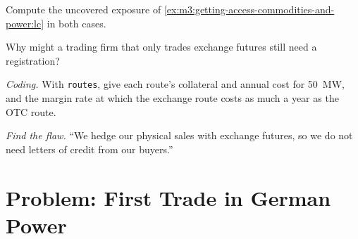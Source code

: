 \begin{exercise}[$\star\star$]\label{exo:m3:getting-access-commodities-and-power:5}
Compute the uncovered exposure of \cref{ex:m3:getting-access-commodities-and-power:lc} in both cases.
\end{exercise}

\begin{exercise}[$\star\star$]\label{exo:m3:getting-access-commodities-and-power:6}
Why might a trading firm that only trades exchange futures still need a  registration?
\end{exercise}

\begin{exercise}[$\star\star\star$]\label{exo:m3:getting-access-commodities-and-power:7}
\emph{Coding.} With \texttt{routes}, give each route's collateral and annual cost for 50~MW, and the margin rate
at which the exchange route costs as much a year as the OTC route.
\end{exercise}

\begin{exercise}[$\star\star\star$]\label{exo:m3:getting-access-commodities-and-power:8}
\emph{Find the flaw.} ``We hedge our physical sales with exchange futures, so we do not need letters of credit
from our buyers.''
\end{exercise}

\section{Problem: First Trade in German Power}

